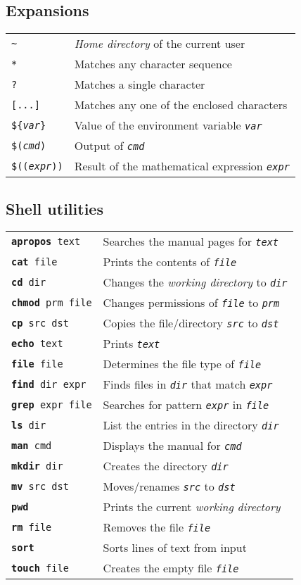 \documentclass[landscape, a4paper]{article}
\newcommand{\cl}[1]{\texttt{#1}}
\newcommand{\cv}[1]{\textit{\texttt{#1}}}
\newcommand{\shcmd}[2]{\texttt{\textbf{#1} #2}}
\begin{document}
\begin{multicols*}{3}
\subsection*{Expansions}
\begin{tabular}{ll}
\cl{\textasciitilde}    & \textit{Home directory} of the current user\\
\cl{*}                  & Matches any character sequence\\
\cl{?}                  & Matches a single character\\
\cl{[...]}              & Matches any one of the enclosed characters\\
\cl{\$\{\cv{var}\cl\}}  & Value of the environment variable \cv{var}\\
\cl{\$(\cv{cmd})}       & Output of \cv{cmd}\\
\cl{\$((\cv{expr}))}    & Result of the mathematical expression \cv{expr}
\end{tabular}

\subsection*{Shell utilities}
\begin{tabular}{ll}
\shcmd{apropos}{text}       & Searches the manual pages for \cv{text}\\
\shcmd{cat}{file}           & Prints the contents of \cv{file}\\
\shcmd{cd}{dir}             & Changes the \textit{working directory} to \cv{dir}\\
\shcmd{chmod}{prm file}     & Changes permissions of \cv{file} to \cv{prm}\\
\shcmd{cp}{src dst}         & Copies the file/directory \cv{src} to \cv{dst}\\
\shcmd{echo}{text}          & Prints \cv{text}\\
\shcmd{file}{file}          & Determines the file type of \cv{file}\\
\shcmd{find}{dir expr}      & Finds files in \cv{dir} that match \cv{expr}\\
\shcmd{grep}{expr file}     & Searches for pattern \cv{expr} in \cv{file}\\
\shcmd{ls}{dir}             & List the entries in the directory \cv{dir}\\
\shcmd{man}{cmd}            & Displays the manual for \cv{cmd}\\
\shcmd{mkdir}{dir}          & Creates the directory \cv{dir}\\
\shcmd{mv}{src dst}         & Moves/renames \cv{src} to \cv{dst}\\
\shcmd{pwd}{}               & Prints the current \textit{working directory}\\
\shcmd{rm}{file}            & Removes the file \cv{file}\\
\shcmd{sort}{}              & Sorts lines of text from input\\
\shcmd{touch}{file}         & Creates the empty file \cv{file}
\end{tabular}

\end{multicols*}
\end{document}
